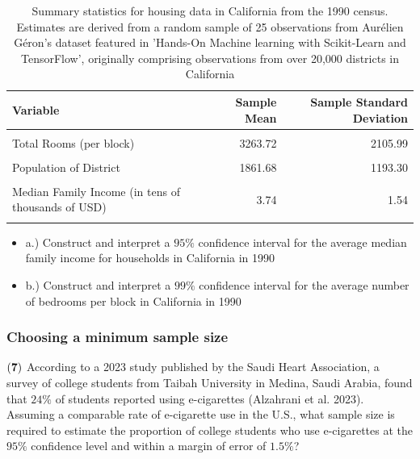 \documentclass[
]{article}
\begin{document}
\begin{table}[H]
\centering\centering
\caption{\label{tab:unnamed-chunk-5}Summary statistics for housing data in California from the 1990 census. Estimates are derived from a random sample of 25 observations from Aurélien Géron's dataset featured in 'Hands-On Machine learning with Scikit-Learn and TensorFlow', originally comprising observations from over 20,000 districts in California}
\centering
\begin{tabular}[t]{lrr}
\toprule
Variable & Sample Mean & Sample Standard Deviation\\
\midrule
\cellcolor{gray!10}{Median Age of Houses (per block)} & \cellcolor{gray!10}{24.28} & \cellcolor{gray!10}{13.56}\\
Total Rooms (per block) & 3263.72 & 2105.99\\
\cellcolor{gray!10}{Total Bedrooms (per block)} & \cellcolor{gray!10}{640.52} & \cellcolor{gray!10}{380.55}\\
Population of District & 1861.68 & 1193.30\\
\cellcolor{gray!10}{Number of Households (per block)} & \cellcolor{gray!10}{584.24} & \cellcolor{gray!10}{330.38}\\
\addlinespace
Median Family Income (in tens of thousands of USD) & 3.74 & 1.54\\
\cellcolor{gray!10}{Median House value (USD)} & \cellcolor{gray!10}{179320.04} & \cellcolor{gray!10}{109450.56}\\
\bottomrule
\end{tabular}
\end{table}

\begin{itemize}
\item
  a.) Construct and interpret a \(95\%\) confidence interval for the
  average median family income for households in California in 1990
\item
  b.) Construct and interpret a \(99\%\) confidence interval for the
  average number of bedrooms per block in California in 1990
\end{itemize}

\subsubsection{Choosing a minimum sample
size}\label{choosing-a-minimum-sample-size}

\(\bf (7)\) According to a 2023 study published by the Saudi Heart
Association, a survey of college students from Taibah University in
Medina, Saudi Arabia, found that \(24\%\) of students reported using
e-cigarettes (Alzahrani et al. 2023). Assuming a comparable rate of
e-cigarette use in the U.S., what sample size is required to estimate
the proportion of college students who use e-cigarettes at the \(95\%\)
confidence level and within a margin of error of \(1.5\%\)?
\end{document}
